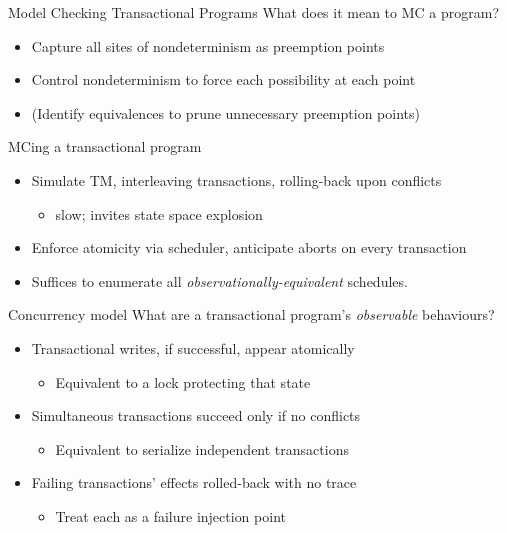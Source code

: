\documentclass[xcolor=dvipsnames]{beamer}
\begin{document}
\begin{frame}{Model Checking Transactional Programs}
	What does it mean to MC a program?
	\begin{itemize}
		\item Capture all sites of nondeterminism as preemption points
		\item Control nondeterminism to force each possibility at each point
		\item (Identify equivalences to prune unnecessary preemption points)
	\end{itemize}
	\pause
	\linegap

	MCing a transactional program
	\begin{itemize}
		\item Simulate TM, interleaving transactions, rolling-back upon conflicts
			\begin{itemize}
				\item slow; invites state space explosion
			\end{itemize}
		\item Enforce atomicity via scheduler, anticipate aborts on every transaction
		\item Suffices to enumerate all {\em observationally-equivalent} schedules.
	\end{itemize}
\end{frame}

\begin{frame}{Concurrency model}
	What are a transactional program's {\em observable} behaviours?
	\begin{itemize}
		\item Transactional writes, if successful, appear atomically %
		\begin{itemize}
			\item Equivalent to a lock protecting that state
		\end{itemize}
			\pause
		\item Simultaneous transactions succeed only if no conflicts
		\begin{itemize}
			\item Equivalent
				to serialize independent transactions
		\end{itemize}
			\pause
		\item Failing transactions' effects rolled-back with no trace
		\begin{itemize}
			\item Treat each \xbegin as a failure injection point
		\end{itemize}
	\end{itemize}
\end{frame}
\end{document}
